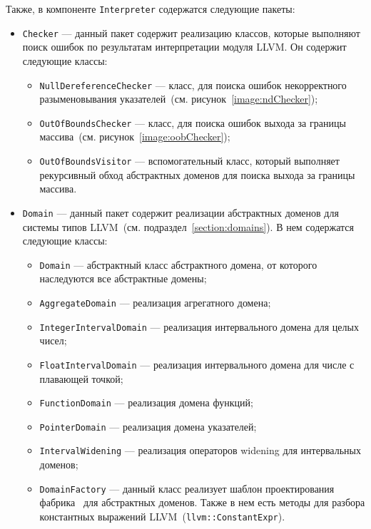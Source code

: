 Также, в компоненте \texttt{Interpreter} содержатся следующие пакеты:
\begin{itemize}
\item \texttt{Checker} --- данный пакет содержит реализацию классов, которые 
выполняют поиск ошибок по результатам интерпретации модуля LLVM. Он содержит 
следующие классы:
    \begin{itemize}
    \item \texttt{NullDereferenceChecker} --- класс, для поиска ошибок 
    некорректного разыменовывания указателей~(см. рисунок~\ref{image:ndChecker});
    \item \texttt{OutOfBoundsChecker} --- класс, для поиска ошибок выхода за 
    границы массива~(см. рисунок~\ref{image:oobChecker});
    \item \texttt{OutOfBoundsVisitor} --- вспомогательный класс, который 
    выполняет рекурсивный обход абстрактных доменов для поиска выхода за границы
    массива.
    \end{itemize}
\item \texttt{Domain} --- данный пакет содержит реализации абстрактных доменов для системы типов LLVM~(см. подраздел~\ref{section:domains}). В нем содержатся 
следующие классы:
    \begin{itemize}
    \item \texttt{Domain} --- абстрактный класс абстрактного домена, от которого
    наследуются все абстрактные домены;
    \item \texttt{AggregateDomain} --- реализация агрегатного домена;
    \item \texttt{IntegerIntervalDomain} --- реализация интервального домена для 
    целых чисел;
    \item \texttt{FloatIntervalDomain} --- реализация интервального домена для 
    числе с плавающей точкой;
    \item \texttt{FunctionDomain} --- реализация домена функций;
    \item \texttt{PointerDomain} --- реализация домена указателей;
    \item \texttt{IntervalWidening} --- реализация операторов widening для 
    интервальных доменов;
    \item \texttt{DomainFactory} --- данный класс реализует шаблон 
    проектирования фабрика~\cite{factory} для абстрактных доменов. Также в нем 
    есть методы для разбора константных выражений 
    LLVM~(\texttt{llvm::ConstantExpr}).
    \end{itemize}


\end{itemize}
